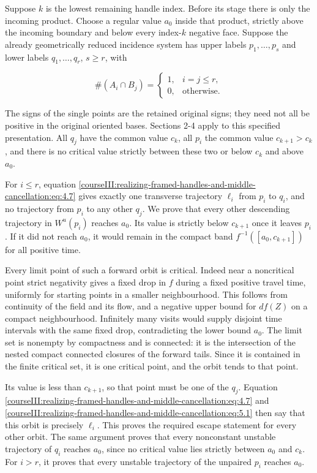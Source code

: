 Suppose \(k\) is the lowest remaining handle index. Before its stage there is only the incoming product. Choose a regular value \(a_0\) inside that product, strictly above the incoming boundary and below every index-\(k\) negative face. Suppose the already geometrically reduced incidence system has upper labels \(p_1,\ldots,p_s\) and lower labels \(q_1,\ldots,q_r\), \(s\geq r\), with

\begin{equation}
\#(A_i\cap B_j)=
 \begin{cases}
 1,&i=j\leq r,\\
 0,&\text{otherwise}.
 \end{cases}
 \label{courseIII:realizing-framed-handles-and-middle-cancellation:eq:5.1}
\end{equation}

The signs of the single points are the retained original signs; they need not all be positive in the original oriented bases. Sections 2-4 apply to this specified presentation. All \(q_j\) have the common value \(c_k\), all \(p_i\) the common value \(c_{k+1}>c_k\), and there is no critical value strictly between these two or below \(c_k\) and above \(a_0\).

For \(i\leq r\), equation \eqref{courseIII:realizing-framed-handles-and-middle-cancellation:eq:4.7} gives exactly one transverse trajectory \(\ell_i\) from \(p_i\) to \(q_i\), and no trajectory from \(p_i\) to any other \(q_j\). We prove that every other descending trajectory in \(W^u(p_i)\) reaches \(a_0\). Its value is strictly below \(c_{k+1}\) once it leaves \(p_i\). If it did not reach \(a_0\), it would remain in the compact band \(f^{-1}([a_0,c_{k+1}])\) for all positive time.

Every limit point of such a forward orbit is critical. Indeed near a noncritical point strict negativity gives a fixed drop in \(f\) during a fixed positive travel time, uniformly for starting points in a smaller neighbourhood. This follows from continuity of the field and its flow, and a negative upper bound for \(df(Z)\) on a compact neighbourhood. Infinitely many visits would supply disjoint time intervals with the same fixed drop, contradicting the lower bound \(a_0\). The limit set is nonempty by compactness and is connected: it is the intersection of the nested compact connected closures of the forward tails. Since it is contained in the finite critical set, it is one critical point, and the orbit tends to that point.

Its value is less than \(c_{k+1}\), so that point must be one of the \(q_j\). Equation \eqref{courseIII:realizing-framed-handles-and-middle-cancellation:eq:4.7} and \eqref{courseIII:realizing-framed-handles-and-middle-cancellation:eq:5.1} then say that this orbit is precisely \(\ell_i\). This proves the required escape statement for every other orbit. The same argument proves that every nonconstant unstable trajectory of \(q_i\) reaches \(a_0\), since no critical value lies strictly between \(a_0\) and \(c_k\). For \(i>r\), it proves that every unstable trajectory of the unpaired \(p_i\) reaches \(a_0\).


